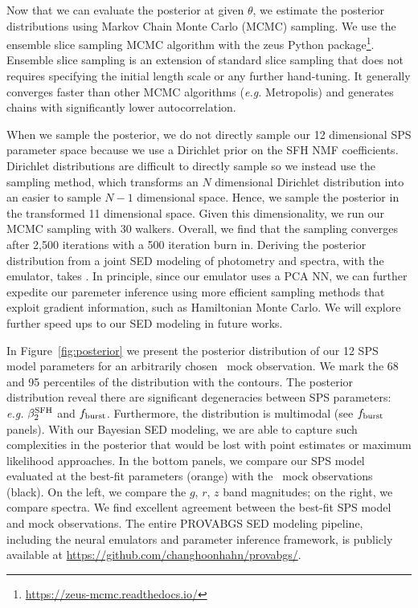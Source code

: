 Now that we can evaluate the posterior at given $\theta$, we estimate the
posterior distributions using Markov Chain Monte Carlo (MCMC) sampling. 
We use the \cite{karamanis2020} ensemble slice sampling MCMC algorithm with the
{\sc zeus} Python
package\footnote{\href{https://zeus-mcmc.readthedocs.io/}{https://zeus-mcmc.readthedocs.io/}}. 
Ensemble slice sampling is an extension of standard slice sampling that does
not requires specifying the initial length scale or any further hand-tuning.
It generally converges faster than other MCMC algorithms (\emph{e.g.}
Metropolis) and generates chains with significantly lower autocorrelation.

When we sample the posterior, we do not directly sample our 12 dimensional
SPS parameter space because we use a Dirichlet prior on the SFH NMF
coefficients. 
Dirichlet distributions are difficult to directly sample so we instead use the
\cite{betancourt2012} sampling method, which transforms an $N$ dimensional
Dirichlet distribution into an easier to sample $N-1$ dimensional space.
Hence, we sample the posterior in the transformed 11 dimensional space. 
Given this dimensionality, we run our MCMC sampling with 30 walkers.
Overall, we find that the sampling converges after 2,500 iterations with a 500
iteration burn in. 
Deriving the posterior distribution from a joint SED modeling of photometry and
spectra, with the emulator, takes . 
In principle, since our emulator uses a PCA NN, we can further expedite our
paremeter inference using more efficient sampling methods that exploit gradient
information, such as Hamiltonian Monte Carlo.  
We will explore further speed ups to our SED modeling in future works. 

In Figure~\ref{fig:posterior} we present the posterior distribution of our 12
SPS model parameters for an arbitrarily chosen \lgal~mock observation. 
We mark the 68 and 95 percentiles of the distribution with the contours. 
The posterior distribution reveal there are significant degeneracies between
SPS parameters: \emph{e.g.} $\beta_2^{\rm SFH}$ and $f_{\rm burst}$. 
Furthermore, the distribution is multimodal (see $f_{\rm burst}$ panels). 
With our Bayesian SED modeling, we are able to capture such complexities in the
posterior that would be lost with point estimates or maximum likelihood
approaches.
In the bottom panels, we compare our SPS model evaluated at the best-fit
parameters (orange) with the \lgal~mock observations (black). 
On the left, we compare the $g$, $r$, $z$ band magnitudes; on the right, we
compare spectra. 
We find excellent agreement between the best-fit SPS model and mock
observations.
The entire PROVABGS SED modeling pipeline, including the neural emulators and
parameter inference framework, is publicly available at
\href{https://github.com/changhoonhahn/provabgs/}{https://github.com/changhoonhahn/provabgs/}. 
